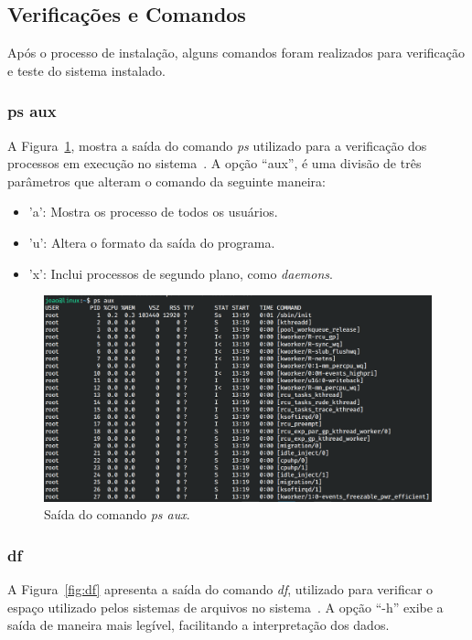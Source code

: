 \documentclass[
	12pt,				%
	oneside,   	        %
	a4paper,			%
	english,			%
	french,				%
	spanish,			%
	brazil,				%
	]{pacotes/abntex2}
\begin{document}
\subsection{Verificações e Comandos}
\label{subsec:verificacao}

Após o processo de instalação, alguns comandos foram realizados para verificação e teste do sistema instalado.

\subsubsection{ps aux}
A Figura~\ref{fig:ps}, mostra a saída do comando \textit{ps} utilizado para a verificação dos processos em execução no sistema~\cite{negus2012}. A opção ``aux'', é uma divisão de três parâmetros que alteram o comando da seguinte maneira:

\begin{itemize}
    \item 'a': Mostra os processo de todos os usuários.
    
    \item 'u': Altera o formato da saída do programa.
    
    \item 'x': Inclui processos de segundo plano, como \textit{daemons}.
\end{itemize}

\begin{figure}[H]
  \centering
  \includegraphics[scale=0.37]{figuras/ps_aux.png}
  \caption{Saída do comando \textit{ps aux}.}
  \label{fig:ps}
\end{figure}

\subsubsection{df}
A Figura~\ref{fig:df} apresenta a saída do comando \textit{df}, utilizado para verificar o espaço utilizado pelos sistemas de arquivos no sistema~\cite{negus2012}. A opção ``-h'' exibe a saída de maneira mais legível, facilitando a interpretação dos dados.
\end{document}

